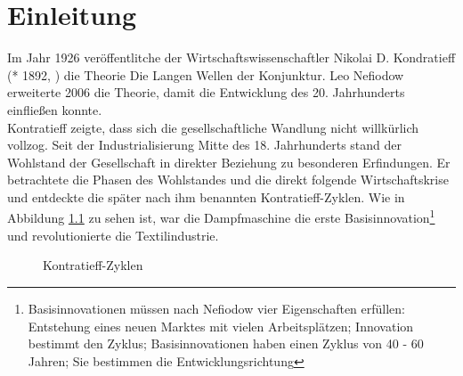 \chapter{Einleitung}

Im Jahr 1926 veröffentlitche der Wirtschaftswissenschaftler Nikolai D. Kondratieff (* 1892, ) die Theorie \glqq Die Langen Wellen der Konjunktur\grqq \cite{hensen:gesundeGesellschaft}.
Leo Nefiodow erweiterte 2006 die Theorie, damit die Entwicklung des 20. Jahrhunderts einfließen konnte.\\
Kontratieff zeigte, dass sich die gesellschaftliche Wandlung nicht willkürlich vollzog. Seit der Industrialisierung Mitte des 18. Jahrhunderts stand der Wohlstand der Gesellschaft in direkter Beziehung zu besonderen Erfindungen. Er betrachtete die Phasen des Wohlstandes und die direkt folgende Wirtschaftskrise und entdeckte die später nach ihm benannten \glqq Kontratieff-Zyklen\grqq.
Wie in Abbildung \ref{zyklen} zu sehen ist, war die Dampfmaschine die erste Basisinnovation\footnote{Basisinnovationen müssen nach Nefiodow vier Eigenschaften erfüllen: Entstehung eines neuen Marktes mit vielen Arbeitsplätzen; Innovation bestimmt den Zyklus; Basisinnovationen haben einen Zyklus von 40 - 60 Jahren; Sie bestimmen die Entwicklungsrichtung} und revolutionierte die Textilindustrie.\cite{wieden:liquidwork}


\begin{figure}[htbp]
  \vspace{0.5cm}
  \centering
  \caption{Kontratieff-Zyklen}
  \label{zyklen}
  \vspace{0.5cm}
\end{figure}

